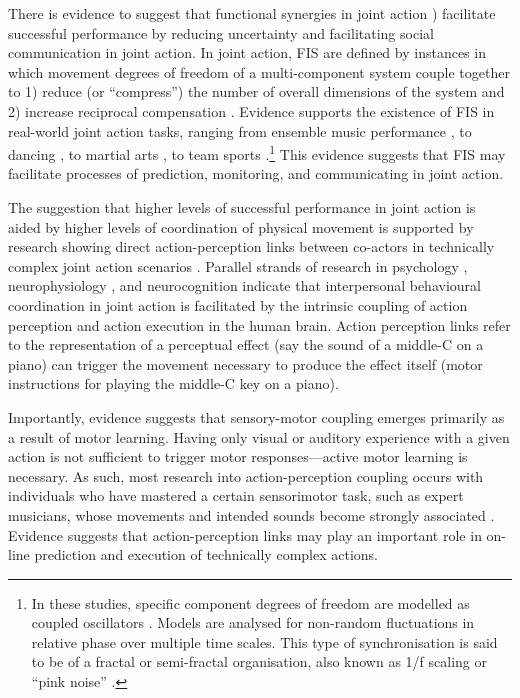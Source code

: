 \begin{CJK}{UTF8}{gbsn}
There is evidence to suggest that functional synergies in joint action \citep[``functional interpersonal synergies,'' hereafter FIS;][]{Riley2011}) facilitate successful performance by reducing uncertainty and facilitating social communication in joint action.  In joint action, FIS are defined by instances in which movement degrees of freedom of a multi-component system couple together to 1) reduce (or ``compress'') the number of overall dimensions of the system and 2) increase reciprocal compensation \citep[the ability of one component of a synergy to react to changes in others; see][]{Riley2011}. Evidence supports the existence of FIS in real-world joint action tasks, ranging from ensemble music performance \citep{Keller2012,Miyata2017}, to dancing \citep{Chauvigne2017}, to martial arts \citep{Schmidt2012}, to team sports \citep{Duarte2012,Passos2014}.\footnote{In these studies, specific component degrees of freedom are modelled as coupled oscillators \citep[using the HKB model, which describes the change in the relative phase between two oscillatory components.  See][]{Haken1985,Kelso1986}.  Models are analysed for non-random fluctuations in relative phase over multiple time scales.  This type of synchronisation is said to be of a fractal or semi-fractal organisation, also known as 1/f scaling or ``pink noise'' \citep{Caron2017}.} This evidence suggests that FIS may facilitate processes of prediction, monitoring, and communicating in joint action.

The suggestion that higher levels of successful performance in joint action is aided by higher levels of coordination of physical movement is supported by research showing direct action-perception links between co-actors in technically complex joint action scenarios \citep{Novembre2014}.  Parallel strands of research in psychology \citep{Prinz1990,Prinz1997,Prinz2013}, neurophysiology \citep{Rizzolatti2004,Rizzolatti2010}, and neurocognition \citep{Wolpert1998,Wolpert2000} indicate that interpersonal behavioural coordination in joint action is facilitated by the intrinsic coupling of action perception and action execution in the human brain.  Action perception links refer to the representation of a perceptual effect (say the sound of a middle-C on a piano) can trigger the movement necessary to produce the effect itself (motor instructions for playing the middle-C key on a piano).

Importantly, evidence suggests that sensory-motor coupling emerges primarily as a result of motor learning. Having only visual \citep{Candidi2014} or auditory \citep{Lahav2007} experience with a given action is not sufficient to trigger motor responses---active motor learning is necessary.  As such, most research into action-perception coupling occurs with individuals who have mastered a certain sensorimotor task, such as expert musicians, whose movements and intended sounds become strongly associated \citep{Novembre2014}.  Evidence suggests that action-perception links may play an important role in on-line prediction \citep{Maidhof2009,Ruiz2009} and execution \citep{Drost2005a,Keller2010} of technically complex actions.


\end{CJK}
